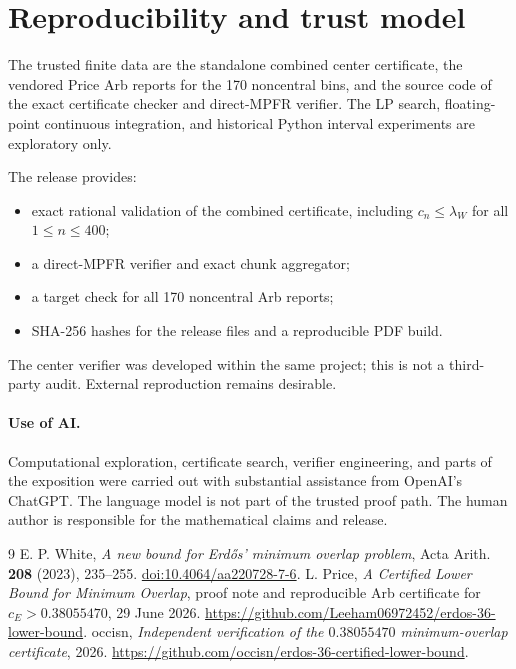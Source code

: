 \documentclass[11pt]{amsart}
\begin{document}
\section{Reproducibility and trust model}
The trusted finite data are the standalone combined center certificate, the
vendored Price Arb reports for the 170 noncentral bins, and the source code of
the exact certificate checker and direct-MPFR verifier.  The LP search,
floating-point continuous integration, and historical Python interval
experiments are exploratory only.

The release provides:
\begin{itemize}
\item exact rational validation of the combined certificate, including
      $c_n\le\lambda_W$ for all $1\le n\le400$;
\item a direct-MPFR verifier and exact chunk aggregator;
\item a target check for all 170 noncentral Arb reports;
\item SHA-256 hashes for the release files and a reproducible PDF build.
\end{itemize}
The center verifier was developed within the same project; this is not a
third-party audit.  External reproduction remains desirable.

\paragraph{Use of AI.}
Computational exploration, certificate search, verifier engineering, and parts
of the exposition were carried out with substantial assistance from OpenAI's
ChatGPT.  The language model is not part of the trusted proof path.  The human
author is responsible for the mathematical claims and release.

\begin{thebibliography}{9}
E. P. White, \emph{A new bound for Erd\H{o}s' minimum overlap problem},
Acta Arith. \textbf{208} (2023), 235--255.
\href{https://doi.org/10.4064/aa220728-7-6}{doi:10.4064/aa220728-7-6}.
L. Price, \emph{A Certified Lower Bound for Minimum Overlap}, proof note and
reproducible Arb certificate for $c_E>0.38055470$, 29 June 2026.
\url{https://github.com/Leeham06972452/erdos-36-lower-bound}.
occisn, \emph{Independent verification of the $0.38055470$ minimum-overlap certificate}, 2026.
\url{https://github.com/occisn/erdos-36-certified-lower-bound}.
\end{thebibliography}
\end{document}
